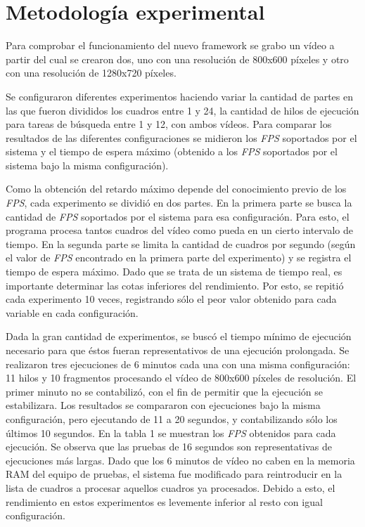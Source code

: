 
\section{Metodología experimental}

Para comprobar el funcionamiento del nuevo framework se grabo un vídeo a partir
del cual se crearon dos, uno con una resolución de 800x600 píxeles y otro con
una resolución de 1280x720 píxeles.

Se configuraron diferentes experimentos haciendo variar la cantidad de partes en
las que fueron divididos los cuadros entre 1 y 24, la cantidad de hilos de
ejecución para tareas de búsqueda entre 1 y 12, con ambos vídeos. Para comparar
los resultados de las diferentes configuraciones se midieron los \emph{FPS}
soportados por el sistema y el tiempo de espera máximo (obtenido a los
\emph{FPS} soportados por el sistema bajo la misma configuración).

Como la obtención del retardo máximo depende del conocimiento previo de los
\emph{FPS}, cada experimento se dividió en dos partes. En la primera parte se
busca la cantidad de \emph{FPS} soportados por el sistema para esa
configuración. Para esto, el programa procesa tantos cuadros del vídeo como
pueda en un cierto intervalo de tiempo. En la segunda parte se limita la
cantidad de cuadros por segundo (según el valor de \emph{FPS} encontrado en la
primera parte del experimento) y se registra el tiempo de espera máximo. Dado
que se trata de un sistema de tiempo real, es importante determinar las cotas
inferiores del rendimiento. Por esto, se repitió cada experimento 10 veces,
registrando sólo el peor valor obtenido para cada variable en cada
configuración.

Dada la gran cantidad de experimentos, se buscó el tiempo mínimo de ejecución
necesario para que éstos fueran representativos de una ejecución prolongada. Se
realizaron tres ejecuciones de 6 minutos cada una con una misma configuración:
11 hilos y 10 fragmentos procesando el vídeo de 800x600 píxeles de resolución.
El primer minuto no se contabilizó, con el fin de permitir que la ejecución se
estabilizara. Los resultados se compararon con ejecuciones bajo la misma
configuración, pero ejecutando de 11 a 20 segundos, y contabilizando sólo los
últimos 10 segundos. En la tabla 1 se muestran los \emph{FPS} obtenidos para
cada ejecución. Se observa que las pruebas de 16 segundos son representativas de
ejecuciones más largas. Dado que los 6 minutos de vídeo no caben en la memoria
RAM del equipo de pruebas, el sistema fue modificado para reintroducir en la
lista de cuadros a procesar aquellos cuadros ya procesados. Debido a esto, el
rendimiento en estos experimentos es levemente inferior al resto con igual
configuración.

